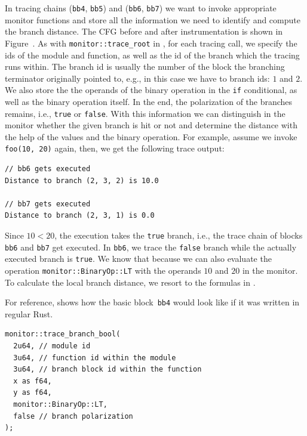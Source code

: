 \documentclass[paper=a4,%
  twoside,%
  BCOR4mm,%
  abstract=true,%
  toc=bibliography,%
  chapterprefix=true,%
  toc=bibliographynumbered,%
  open=right,%
  english,%
  pagesize=pdftex]{scrreprt}
\begin{document}
In tracing chains (\lstinline{bb4}, \lstinline{bb5}) and (\lstinline{bb6}, \lstinline{bb7}) we want to invoke appropriate monitor functions and store all the information we need to identify and compute the branch distance. The \ac{CFG} before and after instrumentation is shown in Figure~. As with \lstinline{monitor::trace_root} in , for each tracing call, we specify the ids of the module and function, as well as the id of the branch which the tracing runs within. The branch id is usually the number of the block the branching terminator originally pointed to, e.g., in this case we have to branch ids: $1$ and $2$. We also store the the operands of the binary operation in the \lstinline{if} conditional, as well as the binary operation itself. In the end, the polarization of the branches remains, i.e., \lstinline{true} or \lstinline{false}. With this information we can distinguish in the monitor whether the given branch is hit or not and determine the distance with the help of the values and the binary operation. For example, assume we invoke \lstinline{foo(10, 20)} again, then, we get the following trace output:

\begin{lstlisting}[language={}, style=boxed, caption={}, label=lst:mir-instrument-branch-trace-output]
// bb6 gets executed
Distance to branch (2, 3, 2) is 10.0

// bb7 gets executed
Distance to branch (2, 3, 1) is 0.0
\end{lstlisting}

Since $10 < 20$, the execution takes the \lstinline{true} branch, i.e., the trace chain of blocks \lstinline{bb6} and \lstinline{bb7} get executed. In \lstinline{bb6}, we trace the \lstinline{false} branch while the actually executed branch is \lstinline{true}. We know that because we can also evaluate the operation \lstinline{monitor::BinaryOp::LT} with the operands $10$ and $20$ in the monitor. To calculate the local branch distance, we resort to the formulas in .

For reference,  shows how the basic block~\lstinline{bb4} would look like if it was written in regular Rust.

\begin{lstlisting}[language={}, style=boxed, caption={How would \lstinline{bb4} look like in regular Rust code}, label=lst:basic-block-in-regular-rust]
monitor::trace_branch_bool(
  2u64, // module id
  3u64, // function id within the module
  3u64, // branch block id within the function
  x as f64,
  y as f64,
  monitor::BinaryOp::LT,
  false // branch polarization
);
\end{lstlisting}
\end{document}
